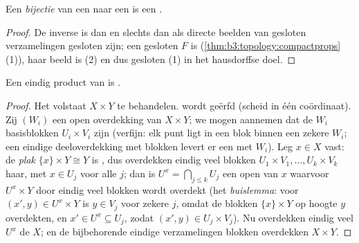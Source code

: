 \begin{corollary}\label{cor:b3:topology:compacthomeo}
Een  \emph{bijectie} van een  naar een
 is een .
\end{corollary}

\begin{proof}
De inverse is  dan en slechts dan als directe beelden van
gesloten verzamelingen gesloten zijn; een gesloten $F$ is 
(\cref{thm:b3:topology:compactprops}(1)), haar beeld is 
(2) en dus gesloten (1) in het hausdorffse doel.
\end{proof}

\begin{theorem}\label{thm:b3:topology:tychonoff}
Een eindig product van  is
.
\end{theorem}

\begin{proof}
Het volstaat $X \times Y$ te behandelen.  wordt geërfd
(scheid in één coördinaat). Zij $(W_i)$ een open overdekking van
$X \times Y$; we mogen aannemen dat de $W_i$ basisblokken $U_i
\times V_i$ zijn (verfijn: elk punt ligt in een blok binnen een
zekere $W_i$; een eindige deeloverdekking met blokken levert er
een met $W_i$). Leg $x \in X$ vast: de \emph{plak} $\{x\}\times Y
\cong Y$ is , dus overdekken eindig veel blokken $U_1\times
V_1, \dots, U_k\times V_k$ haar, met $x \in U_j$ voor alle $j$;
dan is $U^x = \bigcap_{j \leq k} U_j$ een open  van $x$
waarvoor $U^x \times Y$ door eindig veel blokken wordt overdekt
(het \emph{buislemma}: voor $(x', y) \in U^x
\times Y$ is $y \in V_j$ voor zekere $j$, omdat de blokken
$\{x\}\times Y$ op hoogte $y$ overdekten, en $x' \in U^x \subseteq
U_j$, zodat $(x', y) \in U_j \times V_j$). Nu overdekken eindig
veel $U^x$ de  $X$; en de bijbehorende eindige
verzamelingen blokken overdekken $X \times Y$.
\end{proof}

